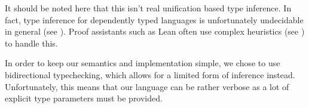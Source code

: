 \documentclass{article}
\begin{document}
It should be noted here that this isn't real unification based type inference.
In fact, type inference for dependently typed languages is unfortunately 
undecidable in general (see \cite{undecidable_type_infer}).
Proof assistants such as Lean often use complex heuristics (see \cite{elab_in_dtt})
to handle this.

In order to keep our semantics and implementation simple, we chose to use
bidirectional typechecking, which allows for a limited form of inference instead. 
Unfortunately, this means that our language can be rather verbose as a lot of 
explicit type parameters must be provided.

\end{document}
